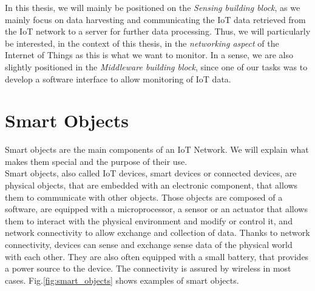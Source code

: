 In this thesis, we will mainly be positioned on the \textit{Sensing building block}, as we mainly focus on data harvesting and communicating the IoT data retrieved from the IoT network to a server for further data processing. Thus, we will particularly be interested, in the context of this thesis, in the \textit{networking aspect} of the Internet of Things as this is what we want to monitor. In a sense, we are also slightly positioned in the \textit{Middleware building block}, since one of our tasks was to develop a software interface to allow monitoring of IoT data.

\section{Smart Objects}

Smart objects are the main components of an IoT Network. We will explain what makes them special and the purpose of their use.\\

Smart objects, also called IoT devices, smart devices or connected devices, are physical objects, that are embedded with an electronic component, that allows them to communicate with other objects. Those objects are composed of a software, are equipped with a microprocessor, a sensor or an actuator that allows them to interact with the physical environment and modify or control it, and network connectivity to allow exchange and collection of data. Thanks to network connectivity, devices can sense and exchange sense data of the physical world with each other. They are also often equipped with a small battery, that provides a power source to the device. The connectivity is assured by wireless in most cases. Fig.\ref{fig:smart_objects} shows examples of smart objects.\\

